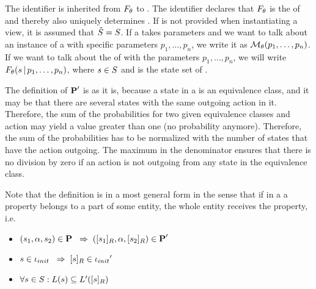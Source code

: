 \documentclass[preview]{standalone}
\begin{document}
The identifier \viewppty is inherited from ${F_{{\theta}}}$ to \view. The identifier declares that ${F_{{\theta}}}$ is the \grpfctN of \view and thereby also uniquely determines \view. If \smstates is not provided when instantiating a view, it is assumed that ${\tilde{{S}}} = {S}$. If a \viewN takes parameters and we want to talk about an instance of a \viewN with specific parameters $p_1, \dots, p_n$, we write it as ${{{{\mathcal{M}}}}_{{\theta}}}(p_1, \dots, p_n)$. If we want to talk about the \grpfctN \grpfct of \view with the parameters $p_1, \dots, p_n$, we will write ${F_{{\theta}}}({s} {\,|\,} p_1, \dots, p_n)$, where ${s} \in {S}$ and \states is the state set of \chgph. 

The definition of ${{\textbf{P}}}'$ is as it is, because a state in a \viewN is an equivalence class, and it may be that there are several states with the same outgoing action in it. Therefore, the sum of the probabilities for two given equivalence classes and action \action may yield a value greater than one (no probability anymore). Therefore, the sum of the probabilities has to be normalized with the number of states that have the action \action outgoing. The maximum in the denominator ensures that there is no division by zero if an action is not outgoing from any state in the equivalence class.

Note that the definition is in a most general form in the sense that if in a \viewN a property belongs to a part of some entity, the whole entity receives the property, i.e.
\begin{itemize}	
	\item $({s}_1, {\alpha}, {s}_2) \in {\ensuremath{{\textbf{P}}}} {\hspace{3mm}\Rightarrow\hspace{2mm}} ({{[{s}_1]_{{R}}}}, {\alpha}, {{[{s}_2]_{{R}}}}) \in {\ensuremath{{\textbf{P}}}}'$
	\item ${s} \in {\ensuremath{{\iota_{init}}}} {\hspace{3mm}\Rightarrow\hspace{2mm}} {\ensuremath{{[{s}]_{{R}}}}} \in {\iota_{init}}'$
	\item $\forall {s} \in {S} : {L}({s}) \subseteq {L}'({{[{s}]_{{R}}}})$
\end{itemize}
\end{document}
